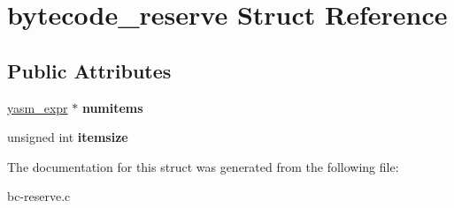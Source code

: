 \hypertarget{structbytecode__reserve}{\section{bytecode\-\_\-reserve Struct Reference}
\label{structbytecode__reserve}
}
\subsection*{Public Attributes}
\begin{DoxyCompactItemize}
\item 
\hypertarget{structbytecode__reserve_a3beb2575519a1faca32c704535a939df}{\hyperlink{structyasm__expr}{yasm\-\_\-expr} $\ast$ {\bfseries numitems}}\label{structbytecode__reserve_a3beb2575519a1faca32c704535a939df}

\item 
\hypertarget{structbytecode__reserve_a3b35c7de29ef1fe1b869c128f6c4df5f}{unsigned int {\bfseries itemsize}}\label{structbytecode__reserve_a3b35c7de29ef1fe1b869c128f6c4df5f}

\end{DoxyCompactItemize}


The documentation for this struct was generated from the following file\-:\begin{DoxyCompactItemize}
\item 
bc-\/reserve.\-c\end{DoxyCompactItemize}
